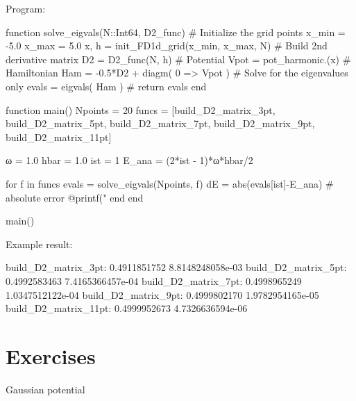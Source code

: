 Program:
\begin{juliacode}
function solve_eigvals(N::Int64, D2_func)
  # Initialize the grid points
  x_min = -5.0
  x_max =  5.0
  x, h = init_FD1d_grid(x_min, x_max, N)
  # Build 2nd derivative matrix
  D2 = D2_func(N, h)
  # Potential
  Vpot = pot_harmonic.(x)
  # Hamiltonian
  Ham = -0.5*D2 + diagm( 0 => Vpot )
  # Solve for the eigenvalues only
  evals = eigvals( Ham )
  #
  return evals
end

function main()
  Npoints = 20
  funcs = [build_D2_matrix_3pt, build_D2_matrix_5pt, build_D2_matrix_7pt,
           build_D2_matrix_9pt, build_D2_matrix_11pt]

  ω = 1.0
  hbar = 1.0
  ist = 1
  E_ana = (2*ist - 1)*ω*hbar/2

  for f in funcs
      evals = solve_eigvals(Npoints, f)
      dE = abs(evals[ist]-E_ana) # absolute error
      @printf("%
  end
end

main()
\end{juliacode}

Example result:
\begin{textcode}
  build_D2_matrix_3pt:       0.4911851752   8.8148248058e-03
  build_D2_matrix_5pt:       0.4992583463   7.4165366457e-04
  build_D2_matrix_7pt:       0.4998965249   1.0347512122e-04
  build_D2_matrix_9pt:       0.4999802170   1.9782954165e-05
 build_D2_matrix_11pt:       0.4999952673   4.7326636594e-06
\end{textcode}

\section{Exercises}

Gaussian potential
